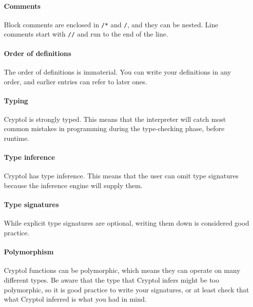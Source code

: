 \paragraph*{Comments}\indComments
Block comments are enclosed in {\tt /*} and {\tt */}, and they can be
nested. Line comments start with {\tt //} and run to the end of the
line.

\paragraph*{Order of definitions}
The order of definitions is immaterial. You can write your definitions
in any order, and earlier entries can refer to later ones.

\paragraph*{Typing}
Cryptol is strongly typed. This means that the interpreter will catch
most common mistakes in programming during the type-checking phase,
before runtime.

\paragraph*{Type inference}
Cryptol has type inference. This means that the user can omit type
signatures because the inference engine will supply
them.\indTypeInference

\paragraph*{Type signatures}
While explicit type signatures are optional, writing them down is
considered good practice.\indSignature

\paragraph*{Polymorphism}
Cryptol functions can be polymorphic, which means they can operate on
many different types.  Be aware that the type that Cryptol infers might
be too polymorphic, so it is good practice to write your signatures,
or at least check that what Cryptol inferred is what you had in
mind.\indPolymorphism\indSignature

